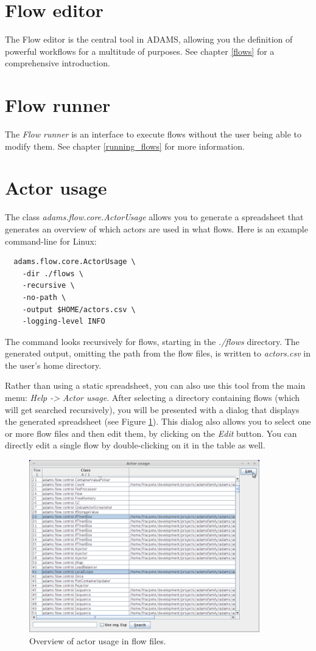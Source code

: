 \section{Flow editor}
The Flow editor is the central tool in ADAMS, allowing you the definition of
powerful workflows for a multitude of purposes. See chapter \ref{flows} for a
comprehensive introduction.

\section{Flow runner}
The \textit{Flow runner} is an interface to execute flows without the user
being able to modify them. See chapter \ref{running_flows} for more information.

\section{Actor usage}
The class \textit{adams.flow.core.ActorUsage} allows you to generate a spreadsheet 
that generates an overview of which actors are used in what flows. Here is an example 
command-line for Linux:
\begin{verbatim}
  adams.flow.core.ActorUsage \
    -dir ./flows \
    -recursive \
    -no-path \
    -output $HOME/actors.csv \
    -logging-level INFO
\end{verbatim}
The command looks recursively for flows, starting in the \textit{./flows}
directory. The generated output, omitting the path from the flow files, is 
written to \textit{actors.csv} in the user's home directory.

Rather than using a static spreadsheet, you can also use this tool from the 
main menu: \textit{Help -> Actor usage}. After selecting a directory containing
flows (which will get searched recursively), you will be presented with a dialog
that displays the generated spreadsheet (see Figure \ref{actor_usage}). This
dialog also allows you to select one or more flow files and then edit them,
by clicking on the \textit{Edit} button. You can directly edit a single flow
by double-clicking on it in the table as well.

\begin{figure}[htb]
  \centering
  \includegraphics[width=10.0cm]{images/actor_usage.png}
  \caption{Overview of actor usage in flow files.}
  \label{actor_usage}
\end{figure}

